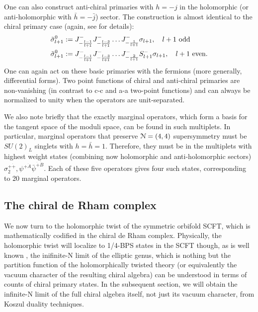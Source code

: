\documentclass[../main.tex]{subfiles}
\begin{document}
One can also construct anti-chiral primaries with $h=-j$ in the holomorphic (or anti-holomorphic with $\bar{h}=-\bar{j}$) sector. The construction is almost identical to the chiral primary case (again, see \cite{LuninMathur} for details):
\begin{align*}
\tilde{\sigma}^0_{l+1}&:=  J^-_{-{l-1 \over l+1}}J^{-}_{-{l-3 \over l+1}} \ldots J^-_{-{1 \over l+1}}\sigma_{l+1}, \ \ \ l+1 \text { odd} \\
\tilde{\sigma}^0_{l+1}&:= J^-_{-{l-1 \over l+1}}J^{-}_{-{l-3 \over l+1}} \ldots J^-_{-{2 \over l+1}}S^-_{l+1}\sigma_{l+1}, \ \ \ l+1 \text { even}.
\end{align*} One can again act on these basic primaries with the fermions (more generally, differential forms). Two point functions of chiral and anti-chiral primaries are non-vanishing (in contrast to c-c and a-a two-point functions) and can always be normalized to unity when the operators are unit-separated.

We also note briefly that the exactly marginal operators, which form a basis for the tangent space of the moduli space, can be found in such multiplets. In particular, marginal operators that preserve $\mathcal{N}=(4,4)$ supersymmetry must be $SU(2)_L$ singlets with $h=\bar{h}=1$. Therefore, they must be in the multiplets with highest weight states (combining now holomorphic and anti-holomorphic sectors) $\sigma^{+ \dot{+} }_{2}, \psi^{+\dot{A}}\bar{\psi}^{\dot{+}\dot{B}}$. Each of these five operators gives four such states, corresponding to 20 marginal operators.

\subsection{The chiral de Rham complex} 
We now turn to the holomorphic twist of the symmetric orbifold SCFT, which is mathematically codified in the chiral de Rham complex. Physically, the holomorphic twist will localize to 1/4-BPS states in the SCFT though, as is well known \cite{deBoerEG}, the inifinite-N limit of the elliptic genus, which is nothing but the partition function of the holomorphically twisted theory (or equivalently the vacuum character of the resulting chiral algebra) can be understood in terms of counts of chiral primary states. In the subsequent section, we will obtain the infinite-N limit of the full chiral algebra itself, not just its vacuum character, from Koszul duality techniques. 
\end{document}
